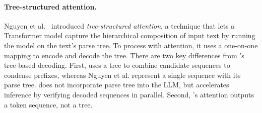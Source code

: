 \paragraph{Tree-structured attention.}
Nguyen et al.~\cite{Nguyen2020} introduced {\em tree-structured attention}, a technique that lets a Transformer model capture the hierarchical composition of input text by running the model on the text's parse tree. To process with attention, it uses a one-on-one mapping to encode and decode the tree.
There are two key differences from \sys's tree-based decoding. First, \sys uses a tree to combine candidate sequences to condense prefixes, whereas Nguyen et al. represent a single sequence with its parse tree. \sys does not incorporate parse tree into the LLM, but accelerates inference by verifying decoded sequences in parallel. Second, \sys's attention outputs a token sequence, not a tree.

